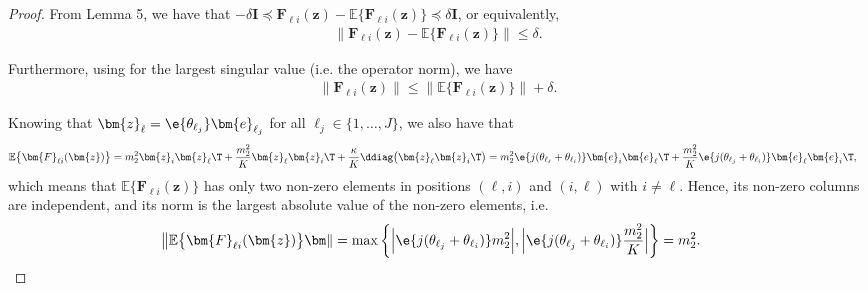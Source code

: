 \begin{proof}
From Lemma 5, we have that $-\delta\bm{I}\preceq\bm{F}_{{\ell}i}(\bm{z})-\mathbb{E}\big\{\bm{F}_{{\ell}i}(\bm{z})\big\}\preceq\delta\bm{I}$, or equivalently, 
\begin{align}
	\big\|\bm{F}_{{\ell}i}(\bm{z})-\mathbb{E}\big\{\bm{F}_{{\ell}i}(\bm{z})\big\}\big\|\leq\delta.\nonumber
\end{align}

Furthermore, using \cite[Corollary 8.6.2]{GolubVanLoan2013} for the largest singular value (i.e. the operator norm), we have
\begin{align}
	\big\|\bm{F}_{{\ell}i}(\bm{z})\big\|\leq\big\|\mathbb{E}\big\{\bm{F}_{{\ell}i}(\bm{z})\big\}\big\|+\delta.\nonumber
\end{align}

Knowing that $\bm{z}_{\ell}=\e{\theta_{\ell_j}}\bm{e}_{\ell_j}$ for all ${\ell}_j\in\{1,\ldots,J\}$, we also have that
\begin{align}
	\mathbb{E}\big\{\bm{F}_{{\ell}i}(\bm{z})\big\}&=m_2^2\bm{z}_i\bm{z}_{\ell}\T+\frac{m_2^2}{K}\bm{z}_{\ell}\bm{z}_i\T+\frac{\kappa}{K}\ddiag\big(\bm{z}_{\ell}\bm{z}_i\T\big) 
	=m_2^2\e{j(\theta_{\ell_{\ell}}+\theta_{\ell_i})}\bm{e}_i\bm{e}_{\ell}\T+\frac{m_2^2}{K}\e{j(\theta_{\ell_j}+\theta_{\ell_i})}\bm{e}_{\ell}\bm{e}_i\T,
	\nonumber
\end{align}
which means that $\mathbb{E}\big\{\bm{F}_{{\ell}i}(\bm{z})\big\}$ has only two non-zero elements in positions $({\ell},i)$ and $(i,{\ell})$ with $i\neq {\ell}$. Hence, its non-zero columns are independent, and its norm is the largest absolute value of the non-zero elements, i.e.
\begin{align}
	\big\|\mathbb{E}\big\{\bm{F}_{{\ell}i}(\bm{z})\big\}\bm\|&=\max\bigg\{\Big|\e{j(\theta_{\ell_j}+\theta_{\ell_i})}m_2^2\Big|,\Big|\e{j(\theta_{\ell_j}+\theta_{\ell_i})}\frac{m_2^2}{K}\Big|\bigg\}=m_2^2.
	\nonumber\qedhere
\end{align}
\end{proof}

